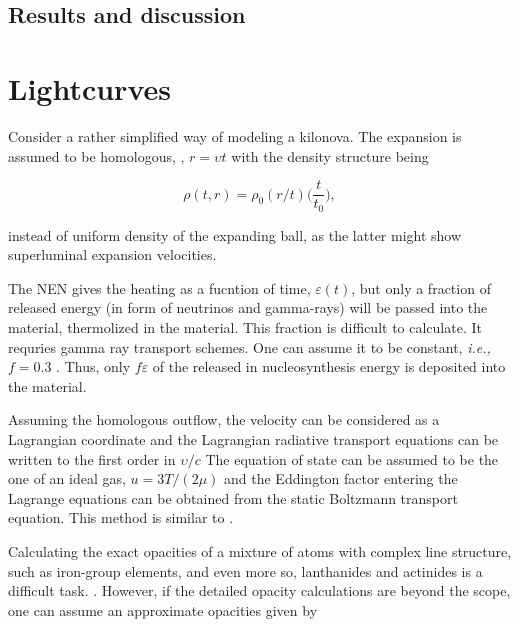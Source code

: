 \subsection{Results and discussion}











\section{Lightcurves}


Consider a rather simplified way of modeling a kilonova. 
The expansion is assumed to be homologous, \ie, $r = \upsilon t$ with the density structure being

\begin{equation}
\rho(t, r) = \rho_0(r/t)\Big(\frac{t}{t_0}\Big),
\end{equation}

instead of uniform density of the expanding ball, as the latter might show superluminal expansion velocities.

The \ac{NEN} gives the heating as a fucntion of time, $\varepsilon(t)$, but only a fraction of released energy (in form of neutrinos and gamma-rays) will be passed into the material, thermolized in the material. This fraction is difficult to calculate. It requries gamma ray transport schemes. One can assume it to be constant, \textit{i.e.,} $f=0.3$ \cite{Barnes:2013wka}. Thus, only $f\varepsilon$ of the released in nucleosynthesis energy is deposited into the material.

Assuming the homologous outflow, the velocity can be considered as a Lagrangian coordinate and the Lagrangian radiative transport equations can be written to the first order in $\upsilon/c$ \citep{Mihalas:1984}
The equation of state can be assumed to be the one of an ideal gas, $u=3T/(2\mu)$ and the Eddington factor entering the Lagrange equations can be obtained from the static Boltzmann transport equation. 
This method is similar to \citep{Ensman:1994}. 

Calculating the exact opacities of a mixture of atoms with complex line structure, such as iron-group elements, and even more so, lanthanides and actinides is a difficult task. .
However, if the detailed opacity calculations are beyond the scope, one can assume an approximate opacities given by 

